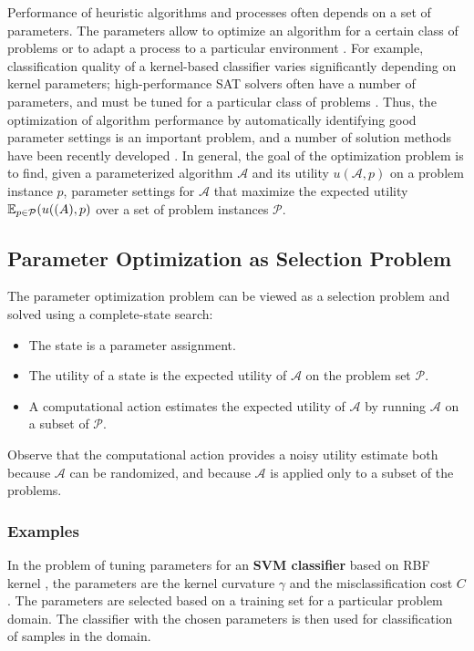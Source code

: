 Performance of heuristic algorithms and processes often depends on a
set of parameters. The parameters allow to optimize an algorithm for a
certain class of problems or to adapt a process to a particular
environment \cite{Leyton.paramils}. For example, classification
quality of a kernel-based classifier varies significantly depending on
kernel parameters; high-performance SAT solvers often have a number of
parameters, and must be tuned for a particular class of problems
\cite{Hutter.sat}. Thus, the optimization of algorithm performance by
automatically identifying good parameter settings is an important
problem, and a number of solution methods have been recently developed
\cite{Hutter.spo}. In general, the goal of the optimization problem is
to find, given a parameterized algorithm $\mathcal{A}$ and its utility
$u(\mathcal{A}, p)$ on a problem instance $p$, parameter settings for
$\mathcal{A}$ that maximize the expected utility $\mathbb{E}_{p\in
\mathcal{P}}(u(\mathcal(A),p)$ over a set of problem instances
$\mathcal{P}$.

\subsection{Parameter Optimization as Selection Problem}

The parameter optimization problem can be viewed as a selection
problem \cite{TolpinShimony.blinkered} and solved using a
complete-state search:
\begin{itemize}
\item The state is a parameter assignment.
\item The utility of a state is the expected utility of $\mathcal{A}$
  on the problem set $\mathcal{P}$. 
\item A computational action estimates the expected utility of
  $\mathcal{A}$ by running $\mathcal{A}$ on a subset of $\mathcal{P}$.
\end{itemize}
Observe that the computational action provides a noisy utility
estimate both because $\mathcal{A}$ can be randomized, and because
$\mathcal{A}$ is applied only to a subset of the problems.

\subsubsection{Examples}

In the problem of tuning parameters for an {\bf SVM classifier}
based on RBF kernel \cite{TolpinShimony.blinkered}, the parameters are
the kernel curvature $\gamma$ and the misclassification cost $C$. The
parameters are selected based on a training set for a particular
problem domain. The classifier with the chosen parameters is then used
for classification of samples in the domain.

